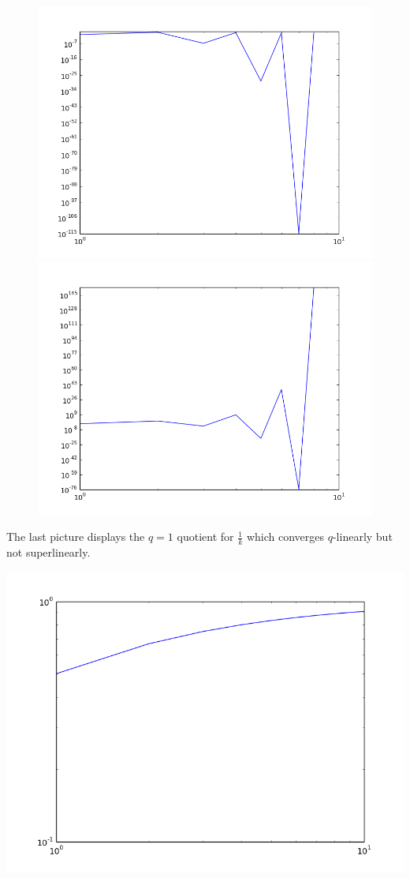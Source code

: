 \documentclass{article}
\begin{document}
\begin{figure}[h!]
  \centering
\includegraphics[scale=0.3]{h_1.png}
\includegraphics[scale=0.5]{h_2.png}  
\end{figure}

The last picture displays the $q=1$ quotient for $\frac{1}{k}$ which converges $q$-linearly but
not superlinearly.
\begin{figure}[h!]
  \centering
  
\end{figure}
\includegraphics[scale=0.5]{r_1.png}
\end{document}
